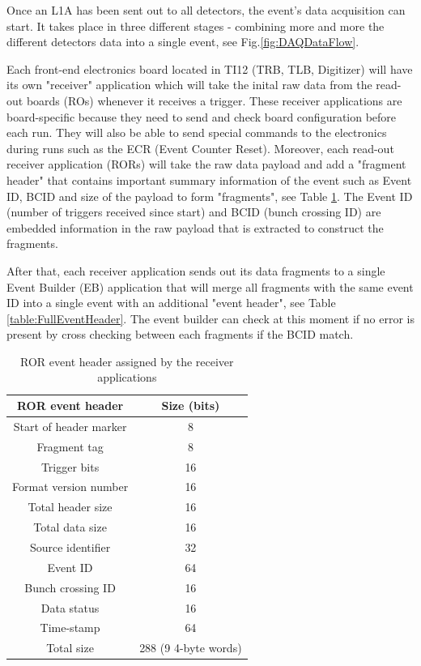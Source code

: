 Once an L1A has been sent out to all detectors, the event's data acquisition can start. It takes place in three different stages - combining more and more the different detectors data into a single event, see Fig.\ref{fig:DAQDataFlow}.

Each front-end electronics board located in TI12 (TRB, TLB, Digitizer) will have its own "receiver" application which will take the inital raw data from the read-out boards (ROs) whenever it receives a trigger. These receiver applications are board-specific because they need to send and check board configuration before each run. They will also be able to send special commands to the electronics during runs such as the ECR (Event Counter Reset). Moreover, each read-out receiver application (RORs) will take the raw data payload and add a  "fragment header" that contains important summary information of the event such as Event ID, BCID and size of the payload to form "fragments", see Table \ref{table:RORHeader}. The Event ID (number of triggers received since start) and BCID (bunch crossing ID) are embedded information in the raw payload that is extracted to construct the fragments.

After that, each receiver application sends out its data fragments to a single Event Builder (EB) application that will merge all fragments with the same event ID into a single event with an additional "event header", see Table \ref{table:FullEventHeader}. The event builder can check at this moment if no error is present by cross checking between each fragments if the BCID match.



\begin{table}[htbp!] 
\caption{ROR event header assigned by the receiver applications}
\centering
\label{table:RORHeader}
\begin{tabular}{c c}
\toprule
ROR event header & Size (bits) \\
\midrule
Start of header marker & 8\\
Fragment tag & 8\\
Trigger bits & 16\\
Format version number & 16\\
Total header size & 16\\
Total data size & 16\\
Source identifier & 32\\
Event ID & 64\\
Bunch crossing ID & 16\\
Data status & 16\\
Time-stamp & 64\\
\midrule
Total size & 288 (9 4-byte words)\\
\bottomrule
\end{tabular}
\end{table}

